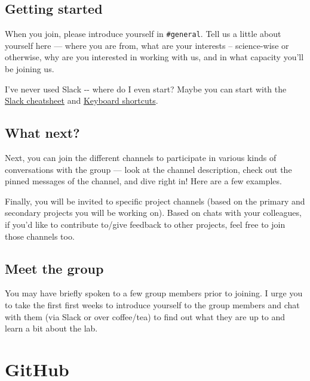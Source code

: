 \documentclass[
  letterpaper,
  DIV=11,
  numbers=noendperiod]{scrreprt}
\begin{document}
\hypertarget{getting-started}{%
\section{Getting started}\label{getting-started}}

When you join, please introduce yourself in \texttt{\#general}. Tell us
a little about yourself here --- where you are from, what are your
interests -- science-wise or otherwise, why are you interested in
working with us, and in what capacity you'll be joining us.

I've never used Slack -\/- where do I even start? Maybe you can start
with the
\href{https://github.com/JRaviLab/cheatsheets/blob/master/slack-misc/slack-cheatsheet.pdf}{Slack
cheatsheet} and
\href{https://slack.com/help/articles/201374536-Slack-keyboard-shortcuts}{Keyboard
shortcuts}.

\hypertarget{what-next}{%
\section{What next?}\label{what-next}}

Next, you can join the different channels to participate in various
kinds of conversations with the group --- look at the channel
description, check out the pinned messages of the channel, and dive
right in! Here are a few examples.

Finally, you will be invited to specific project channels (based on the
primary and secondary projects you will be working on). Based on chats
with your colleagues, if you'd like to contribute to/give feedback to
other projects, feel free to join those channels too.

\hypertarget{meet-the-group}{%
\section{Meet the group}\label{meet-the-group}}

You may have briefly spoken to a few group members prior to joining. I
urge you to take the first first weeks to introduce yourself to the
group members and chat with them (via Slack or over coffee/tea) to find
out what they are up to and learn a bit about the lab.


\hypertarget{github}{%
\chapter{GitHub}\label{github}}
\end{document}
